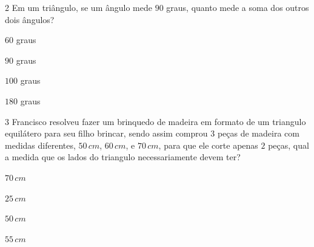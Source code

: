 \num{2}  Em um triângulo, se um ângulo mede $90$ graus, quanto mede a soma dos
outros dois ângulos?

\begin{escolha}
\item $60$ graus
\item $90$ graus
\item $100$ graus
\item $180$ graus
\end{escolha}



\num{3}  Francisco resolveu fazer um brinquedo de madeira em formato de um
triangulo equilátero para seu filho brincar, sendo assim comprou $3$ peças
de madeira com medidas diferentes, $50\,cm$, $60\,cm$, e $70\,cm$, para que ele
corte apenas $2$ peças, qual a medida que os lados do triangulo
necessariamente devem ter?

\begin{escolha}
\item $70\,cm$
\item $25\,cm$
\item $50\,cm$
\item $55\,cm$
\end{escolha}


